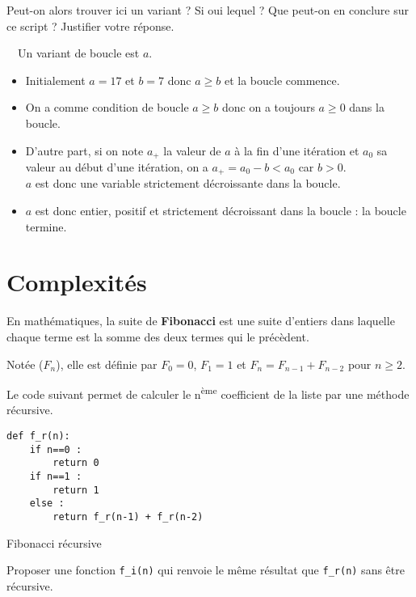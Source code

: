 \begin{exercice}
Peut-on alors trouver ici un variant ? Si oui lequel ? Que peut-on en conclure sur ce script ? Justifier votre réponse.
\end{exercice}

\begin{solution}~\ 
Un variant de boucle est $a$.
\begin{itemize}
\item Initialement $a=17$ et $b=7$ donc $a\geq b$ et la boucle commence.

\item On a comme condition de boucle $a \geq b$ donc on a toujours $a\geq0$ dans la boucle.

\item D'autre part, si on note $a_+$ la valeur de $a$ à la fin d'une itération et $a_0$ sa valeur au début d'une itération, on a $a_+ = a_0 - b < a_0$ car $b>0$.\\$a$ est donc une variable strictement décroissante dans la boucle.

\item $a$ est donc entier, positif et strictement décroissant dans la boucle : la boucle termine.
\end{itemize}
\end{solution}

\section{Complexités}

En mathématiques, la suite de \textbf{Fibonacci} est une suite d'entiers dans laquelle chaque terme est la somme des deux termes qui le précèdent. 

Notée ($F_n$), elle est définie par $F_0=0$, $F_1=1$ et $F_n=F_{n-1}+F_{n-2}$ pour $n\geq2$. 

Le code suivant permet de calculer le n\textsuperscript{ème} coefficient de la liste par une méthode récursive.

\begin{listing}[!h]
\begin{verbatim}
def f_r(n):
    if n==0 :
        return 0
    if n==1 :
        return 1
    else :
        return f_r(n-1) + f_r(n-2)
\end{verbatim}
\caption{Fibonacci récursive}
\label{prog:fibonacci_rec}
\end{listing}

\begin{exercice}
Proposer une fonction \verb?f_i(n)? qui renvoie le même résultat que \verb?f_r(n)? sans être récursive.
\end{exercice}


